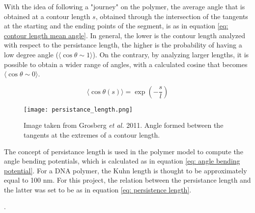 With the idea of following a "journey" on the polymer, the average angle that is obtained at a contour length $s$, obtained through the intersection of the tangents at the starting and the ending points of the segment, is as in equation \ref{eq: contour length mean angle}. In general, the lower is the contour length analyzed with respect to the persistance length, the higher is the probability of having a low degree angle ($\langle\cos{\theta} \sim 1\rangle$). On the contrary, by analyzing larger lengths, it is possible to obtain a wider range of angles, with a calculated cosine that becomes $\langle\cos{\theta} \sim 0\rangle$.

\begin{equation} \label{eq: contour length mean angle}
    \langle \cos{\theta(s)}\rangle = \exp{\left(-\frac{s}{l}\right)}
\end{equation}

\begin{figure}[H] 
    \centering 
    \texttt{[image: persistance\_length.png]} 
    \caption{Image taken from Grosberg \textit{et al.} 2011\cite{grosbergGiantMoleculesHere2011}. Angle formed between the tangents at the extremes of a contour length.} 
    \label{examplelabel} 
\end{figure}

The concept of persistance length is used in the polymer model to compute the angle bending potentials, which is calculated as in equation \ref{eq: angle bending potential}. For a DNA polymer, the Kuhn length is thought to be approximately equal to 100 nm. For this project, the relation between the persistance length and the latter was set to be as in equation \ref{eq: persistence length}.





.


